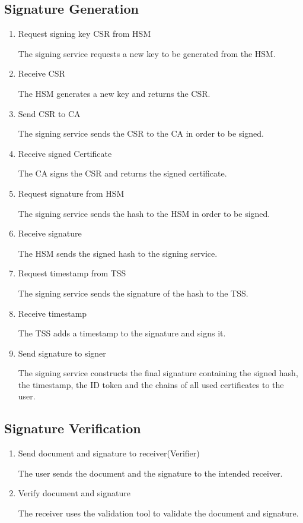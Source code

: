\subsection{Signature Generation}
\begin{enumerate}[resume]
	\item Request signing key \gls{CSR} from \gls{HSM}
	
	The signing service requests a new key to be generated from the \gls{HSM}.
	
	\item Receive \gls{CSR}
	
	The HSM generates a new key and returns the \gls{CSR}.
	
	\item Send \gls{CSR} to \gls{CA}
	
	The signing service sends the \gls{CSR} to the \gls{CA} in order to be signed.
	
	\item Receive signed Certificate
	
	The \gls{CA} signs the \gls{CSR} and returns the signed certificate.
	
	\item Request signature from \gls{HSM}
	
	The signing service sends the hash to the \gls{HSM} in order to be signed.
	
	\item Receive signature
	
	The \gls{HSM} sends the signed hash to the signing service.
	
	\item Request timestamp from \gls{TSS}
	
	The signing service sends the signature of the hash to the \gls{TSS}.
	
	\item Receive timestamp
	
	The \gls{TSS} adds a timestamp to the signature and signs it.

	\item Send signature to signer
	
	The signing service constructs the final signature containing the signed hash, the timestamp, the ID token and the chains of all used certificates to the user.
\end{enumerate}
	
\subsection{Signature Verification}
\begin{enumerate}[resume]
	\item Send document and signature to receiver(Verifier)
	
	The user sends the document and the signature to the intended receiver.
	
	\item Verify document and signature
	
	The receiver uses the validation tool to validate the document and signature.
\end{enumerate}

